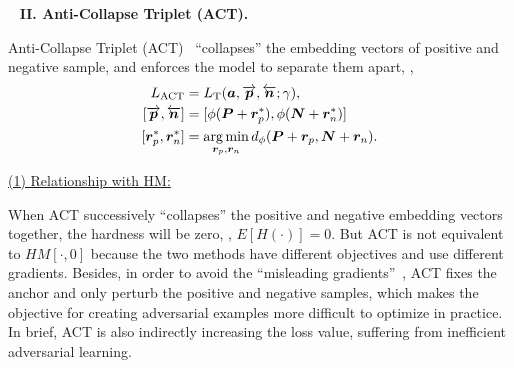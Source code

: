 ~\newline
\noindent\textbf{II. Anti-Collapse Triplet (ACT).}~\cite{robrank}

Anti-Collapse Triplet (ACT)~\cite{robrank} ``collapses'' the embedding vectors
of positive and negative sample, and enforces the model to separate them apart,
\ie,
%
\begin{align}
%
	L_\text{ACT} &=L_\text{T}(\va, \overrightarrow{\vp},
\overleftarrow{\vn};\gamma),\\
%
	[\overrightarrow{\vp},\overleftarrow{\vn}] & =[\phi(\mP+\vr_p^*), \phi(\mN+\vr_n^*)]\\
%
	[\vr_p^*,\vr_n^*] &= \argmin_{\vr_p,\vr_n} d_\phi(\mP+\vr_p, \mN+\vr_n).
%
\end{align}

\ul{(1) Relationship with HM:}

When ACT successively ``collapses'' the positive and negative embedding
vectors together, the hardness will be zero, \ie, $E[H(\cdot)]=0$.
%
But ACT is not equivalent to $HM[\cdot,0]$ because the two methods have
different objectives and use different gradients.
%
Besides, in order to avoid the ``misleading gradients''~\cite{robrank}, ACT
fixes the anchor and only perturb the positive and negative samples, which
makes the objective for creating adversarial examples more difficult to
optimize in practice.
%
In brief, ACT is also indirectly increasing the loss value, suffering from
inefficient adversarial learning.

\begin{table*}[t]
	\caption{Non-linear Gradual Adversary Examples.}
	\label{tab:nonlinga}
\end{table*}


